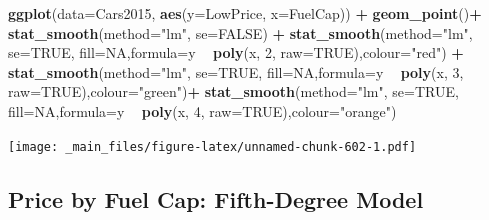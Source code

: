 \documentclass[]{book}
\newenvironment{Shaded}{\begin{snugshade}}{\end{snugshade}}
\newcommand{\KeywordTok}[1]{\textcolor[rgb]{0.13,0.29,0.53}{\textbf{#1}}}
\newcommand{\DataTypeTok}[1]{\textcolor[rgb]{0.13,0.29,0.53}{#1}}
\newcommand{\DecValTok}[1]{\textcolor[rgb]{0.00,0.00,0.81}{#1}}
\newcommand{\StringTok}[1]{\textcolor[rgb]{0.31,0.60,0.02}{#1}}
\newcommand{\OtherTok}[1]{\textcolor[rgb]{0.56,0.35,0.01}{#1}}
\newcommand{\OperatorTok}[1]{\textcolor[rgb]{0.81,0.36,0.00}{\textbf{#1}}}
\newcommand{\NormalTok}[1]{#1}
\begin{document}
\begin{Shaded}
\begin{Highlighting}[]
\KeywordTok{ggplot}\NormalTok{(}\DataTypeTok{data=}\NormalTok{Cars2015, }\KeywordTok{aes}\NormalTok{(}\DataTypeTok{y=}\NormalTok{LowPrice, }\DataTypeTok{x=}\NormalTok{FuelCap)) }\OperatorTok{+}\StringTok{ }\KeywordTok{geom_point}\NormalTok{()}\OperatorTok{+}\StringTok{ }\KeywordTok{stat_smooth}\NormalTok{(}\DataTypeTok{method=}\StringTok{"lm"}\NormalTok{, }\DataTypeTok{se=}\OtherTok{FALSE}\NormalTok{) }\OperatorTok{+}\StringTok{ }\KeywordTok{stat_smooth}\NormalTok{(}\DataTypeTok{method=}\StringTok{"lm"}\NormalTok{, }\DataTypeTok{se=}\OtherTok{TRUE}\NormalTok{, }\DataTypeTok{fill=}\OtherTok{NA}\NormalTok{,}\DataTypeTok{formula=}\NormalTok{y }\OperatorTok{~}\StringTok{ }\KeywordTok{poly}\NormalTok{(x, }\DecValTok{2}\NormalTok{, }\DataTypeTok{raw=}\OtherTok{TRUE}\NormalTok{),}\DataTypeTok{colour=}\StringTok{"red"}\NormalTok{) }\OperatorTok{+}\StringTok{ }
\StringTok{  }\KeywordTok{stat_smooth}\NormalTok{(}\DataTypeTok{method=}\StringTok{"lm"}\NormalTok{, }\DataTypeTok{se=}\OtherTok{TRUE}\NormalTok{, }\DataTypeTok{fill=}\OtherTok{NA}\NormalTok{,}\DataTypeTok{formula=}\NormalTok{y }\OperatorTok{~}\StringTok{ }\KeywordTok{poly}\NormalTok{(x, }\DecValTok{3}\NormalTok{, }\DataTypeTok{raw=}\OtherTok{TRUE}\NormalTok{),}\DataTypeTok{colour=}\StringTok{"green"}\NormalTok{)}\OperatorTok{+}\StringTok{ }
\StringTok{  }\KeywordTok{stat_smooth}\NormalTok{(}\DataTypeTok{method=}\StringTok{"lm"}\NormalTok{, }\DataTypeTok{se=}\OtherTok{TRUE}\NormalTok{, }\DataTypeTok{fill=}\OtherTok{NA}\NormalTok{,}\DataTypeTok{formula=}\NormalTok{y }\OperatorTok{~}\StringTok{ }\KeywordTok{poly}\NormalTok{(x, }\DecValTok{4}\NormalTok{, }\DataTypeTok{raw=}\OtherTok{TRUE}\NormalTok{),}\DataTypeTok{colour=}\StringTok{"orange"}\NormalTok{)}
\end{Highlighting}
\end{Shaded}

\texttt{[image: \_main\_files/figure-latex/unnamed-chunk-602-1.pdf]}

\subsection{Price by Fuel Cap: Fifth-Degree
Model}\label{price-by-fuel-cap-fifth-degree-model}
\end{document}
